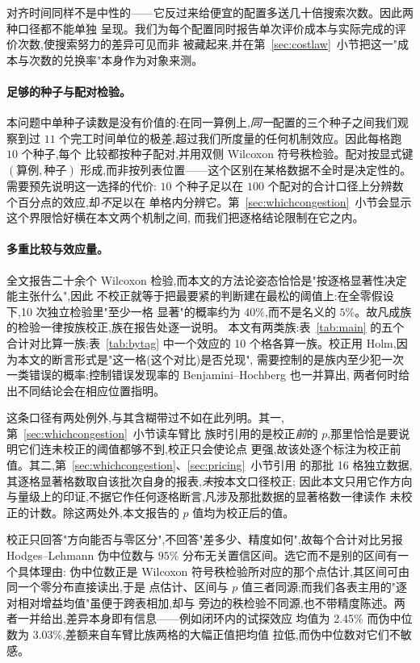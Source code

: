 \documentclass[manuscript,screen,review]{acmart}
\newcommand{\NCases}{10}
\newcommand{\NSeeds}{10}
\newcommand{\NPairs}{100}
\newcommand{\GainProbeLoop}{2.45\%}      %
\newcommand{\HLProbeLoop}{3.03\%}
\newcommand{\MatrixCells}{16}
\begin{document}
对齐时间同样不是中性的——它反过来给便宜的配置多送几十倍搜索次数。因此两种口径都不能单独
呈现。我们为每个配置同时报告单次评价成本与实际完成的评价次数,使搜索努力的差异可见而非
被藏起来,并在第~\ref{sec:costlaw}~小节把这一"成本与次数的兑换率"本身作为对象来测。

\paragraph{足够的种子与配对检验。}
本问题中单种子读数是没有价值的:在同一算例上,\emph{同一}配置的三个种子之间我们观察到过
$11$ 个完工时间单位的极差,超过我们所度量的任何机制效应。因此每格跑 $\NSeeds$ 个种子,每个
比较都按种子配对,并用双侧 Wilcoxon 符号秩检验。配对按显式键 $(\text{算例},\text{种子})$
形成,而非按列表位置——这个区别在某格数据不全时是决定性的。需要预先说明这一选择的代价:
$\NSeeds$ 个种子足以在 $\NPairs$ 个配对的合计口径上分辨数个百分点的效应,却\emph{不}足以在
单格内分辨它。第~\ref{sec:whichcongestion}~小节会显示这个界限恰好横在本文两个机制之间,
而我们把逐格结论限制在它之内。

\paragraph{多重比较与效应量。}
全文报告二十余个 Wilcoxon 检验,而本文的方法论姿态恰恰是"按逐格显著性决定能主张什么",因此
不校正就等于把最要紧的判断建在最松的阈值上:在全零假设下,\NCases{} 次独立检验里"至少一格
显著"的概率约为 $40\%$,而不是名义的 $5\%$。故凡成族的检验一律按族校正,族在报告处逐一说明。
本文有两类族:表~\ref{tab:main} 的五个合计对比算一族;表~\ref{tab:bytag} 中一个效应的
\NCases{} 个格各算一族。校正用 Holm,因为本文的断言形式是"这一格(这个对比)是否兑现",
需要控制的是族内至少犯一次一类错误的概率;控制错误发现率的 Benjamini--Hochberg 也一并算出,
两者何时给出不同结论会在相应位置指明。

这条口径有两处例外,与其含糊带过不如在此列明。其一,第~\ref{sec:whichcongestion}~小节读车臂比
族时引用的是校正\emph{前}的 $p$,那里恰恰是要说明它们连未校正的阈值都够不到,校正只会使论点
更强,故该处逐个标注为校正前值。其二,第~\ref{sec:whichcongestion}、\ref{sec:pricing}~小节引用
的那批 \MatrixCells{} 格独立数据,其逐格显著格数取自该批次自身的报表,\emph{未}按本文口径校正;
因此本文只用它作方向与量级上的印证,不据它作任何逐格断言,凡涉及那批数据的显著格数一律读作
未校正的计数。除这两处外,本文报告的 $p$ 值均为校正后的值。

校正只回答"方向能否与零区分",不回答"差多少、精度如何",故每个合计对比另报
Hodges--Lehmann 伪中位数与 $95\%$ 分布无关置信区间。选它而不是别的区间有一个具体理由:
伪中位数正是 Wilcoxon 符号秩检验所对应的那个点估计,其区间可由同一个零分布直接读出,于是
点估计、区间与 $p$ 值三者同源;而我们各表主用的"逐对相对增益均值"虽便于跨表相加,却与
旁边的秩检验不同源,也不带精度陈述。两者一并给出,差异本身即有信息——例如闭环内的试探效应
均值为 \GainProbeLoop{} 而伪中位数为 \HLProbeLoop{},差额来自车臂比族两格的大幅正值把均值
拉低,而伪中位数对它们不敏感。
\end{document}
